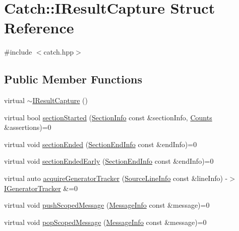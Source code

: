 \hypertarget{struct_catch_1_1_i_result_capture}{}\section{Catch\+:\+:I\+Result\+Capture Struct Reference}
\label{struct_catch_1_1_i_result_capture}


{\ttfamily \#include $<$catch.\+hpp$>$}

\subsection*{Public Member Functions}
\begin{DoxyCompactItemize}
\item 
virtual \mbox{\hyperlink{struct_catch_1_1_i_result_capture_a3bd16719d6772b7470887fc36c6d0808}{$\sim$\+I\+Result\+Capture}} ()
\item 
virtual bool \mbox{\hyperlink{struct_catch_1_1_i_result_capture_a5b76ed52badcb64cf374202e12b81a03}{section\+Started}} (\mbox{\hyperlink{struct_catch_1_1_section_info}{Section\+Info}} const \&section\+Info, \mbox{\hyperlink{struct_catch_1_1_counts}{Counts}} \&assertions)=0
\item 
virtual void \mbox{\hyperlink{struct_catch_1_1_i_result_capture_a4e152bc43dc0933684e31fa67a58195d}{section\+Ended}} (\mbox{\hyperlink{struct_catch_1_1_section_end_info}{Section\+End\+Info}} const \&end\+Info)=0
\item 
virtual void \mbox{\hyperlink{struct_catch_1_1_i_result_capture_afcc71eef8ca821ae132cced4a2be6988}{section\+Ended\+Early}} (\mbox{\hyperlink{struct_catch_1_1_section_end_info}{Section\+End\+Info}} const \&end\+Info)=0
\item 
virtual auto \mbox{\hyperlink{struct_catch_1_1_i_result_capture_ab020d111e29ad1cabe1227dcfda712ef}{acquire\+Generator\+Tracker}} (\mbox{\hyperlink{struct_catch_1_1_source_line_info}{Source\+Line\+Info}} const \&line\+Info) -\/$>$ \mbox{\hyperlink{struct_catch_1_1_i_generator_tracker}{I\+Generator\+Tracker}} \&=0
\item 
virtual void \mbox{\hyperlink{struct_catch_1_1_i_result_capture_a91d154c1e087e383dcde5aad95cb6a05}{push\+Scoped\+Message}} (\mbox{\hyperlink{struct_catch_1_1_message_info}{Message\+Info}} const \&message)=0
\item 
virtual void \mbox{\hyperlink{struct_catch_1_1_i_result_capture_a42bcb13276706bf8c3ce081ce16d37fd}{pop\+Scoped\+Message}} (\mbox{\hyperlink{struct_catch_1_1_message_info}{Message\+Info}} const \&message)=0

\end{DoxyCompactItemize}
